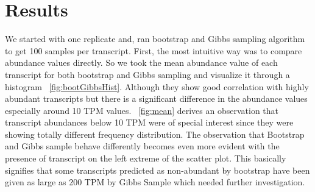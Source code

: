 \documentclass{article}
\begin{document}
\section{Results}

We started with one replicate and, ran bootstrap and Gibbs sampling algorithm to get 100 samples per transcript.
First, the most intuitive way was to compare abundance values directly. So we took the mean abundance value of each transcript for both bootstrap and Gibbs sampling and visualize it through a histogram ~\cref{fig:bootGibbsHist}. Although they show good correlation with highly abundant
transcripts but there is a significant difference in the abundance values especially around 10 TPM values. ~\cref{fig:mean} derives an observation that transcript abundances below 10 TPM were of special interest since they were showing totally different frequency distribution. The observation that Bootstrap and Gibbs sample behave differently becomes even more evident with the presence of transcript on the left extreme of the scatter plot. This basically signifies that some transcripts
predicted as non-abundant by bootstrap have been given as large as 200 TPM by Gibbs Sample which needed further investigation.
\end{document}
